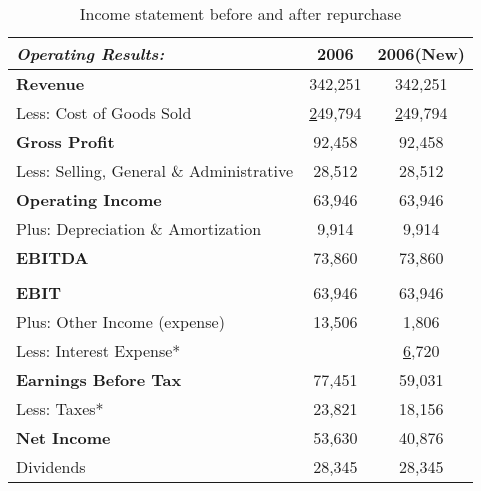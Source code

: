 \begin{table}[ht]
\centering
\begin{tabular}{@{}lcc@{}}
\toprule
\textit{Operating Results:}               & 2006          & 2006(New)     \\ \midrule
\textbf{Revenue}                          & 342,251       & 342,251       \\
Less:  Cost of Goods Sold                 & {\ul 249,794} & {\ul 249,794} \\
\textbf{Gross Profit}                     & 92,458        & 92,458        \\
Less:  Selling, General \& Administrative & 28,512        & 28,512        \\
\textbf{Operating Income}                 & 63,946        & 63,946        \\
Plus:  Depreciation \& Amortization       & 9,914         & 9,914         \\
\textbf{EBITDA}                           & 73,860        & 73,860        \\
                                          &               &               \\
\textbf{EBIT}                             & 63,946        & 63,946        \\
Plus:  Other Income (expense)             & 13,506        & 1,806         \\
Less: Interest Expense*                   &               & {\ul 6,720}   \\
\textbf{Earnings Before Tax}              & 77,451        & 59,031        \\
Less:  Taxes*                             & 23,821        & 18,156        \\
\textbf{Net Income}                       & 53,630        & 40,876        \\
Dividends                                 & 28,345        & 28,345        \\ \bottomrule
\end{tabular}
\caption{Income statement before and after repurchase}
\label{tab:q4-is}
\end{table}

